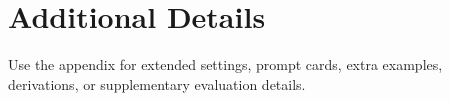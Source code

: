 \section{Additional Details}

Use the appendix for extended settings, prompt cards, extra examples, derivations, or supplementary evaluation details.
